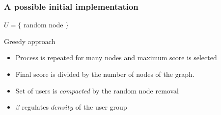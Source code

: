 \documentclass{beamer}
\begin{document}
\begin{frame}[c]
    \frametitle{A possible initial implementation}

    \begin{algorithm}[H]
        \SetAlgoLined
        $U = \{$ random node $\}$\;
        \caption{Greedy approach}
    \end{algorithm}

    \begin{itemize}
        \item Process is repeated for many nodes and maximum score is selected
        \item Final score is divided by the number of nodes of the graph.
        \item Set of users is \textit{compacted} by the random node removal
        \item $\beta $  regulates $density$ of the user group
    \end{itemize}



\end{frame}
\end{document}
